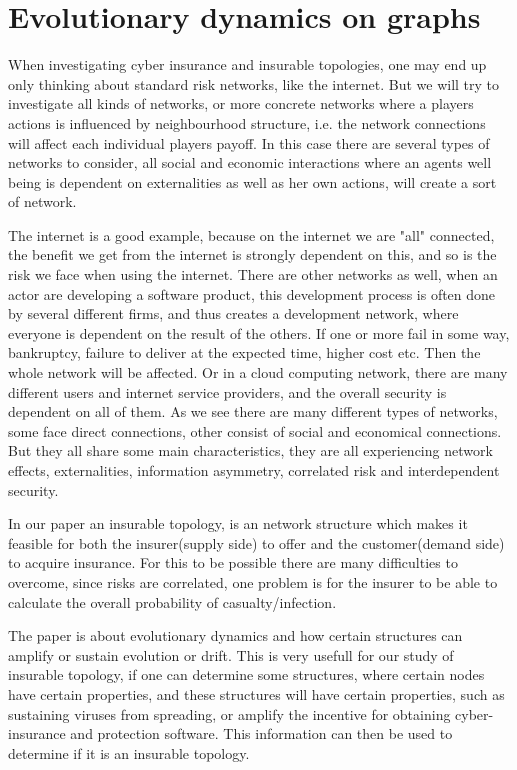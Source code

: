 \chapter{Evolutionary dynamics on graphs}
\label{chp:nature} 

When investigating cyber insurance and insurable topologies, one may end up only thinking about standard risk networks, like the internet. 
But we will try to investigate all kinds of networks, or more concrete networks where a players actions is influenced by neighbourhood structure, i.e. the network connections will affect each individual players payoff. 
In this case there are several types of networks to consider, all social and economic interactions where an agents well being is dependent on externalities as well as her own actions, will create a sort of network.

The internet is a good example, because on the internet we are "all" connected, the benefit we get from the internet is strongly dependent on this, and so is the risk we face when using the internet. 
There are other networks as well, when an actor are developing a software product, this development process is often done by several different firms, and thus creates a development network, where everyone is dependent on the result of the others. 
If one or more fail in some way, bankruptcy, failure to deliver at the expected time, higher cost etc. 
Then the whole network will be affected. 
Or in a cloud computing network, there are many different users and internet service providers, and the overall security is dependent on all of them. 
As we see there are many different types of networks, some face direct connections, other consist of social and economical connections. But they all share some main characteristics, they are all experiencing network effects, externalities, information asymmetry, correlated risk and interdependent security. \cite{networkgames}

In our paper an insurable topology, is an network structure which makes it feasible for both the
 insurer(supply side)  to offer and the customer(demand side) to acquire insurance.
 For this to be possible there are many  difficulties to overcome,  since risks are correlated, 
 one problem is for the insurer to be able to calculate the overall probability of casualty/infection.
 
 The paper \cite{lieberman2005evolutionary} is about evolutionary dynamics and how certain structures
can amplify or sustain evolution or drift. This is very usefull for our study of insurable topology, if one
can determine some structures, where certain nodes have certain properties, and these structures
 will have certain properties, such as sustaining viruses from spreading, or amplify the incentive for obtaining cyber-insurance and
protection software. This information can then be used to determine if it is an insurable topology.

